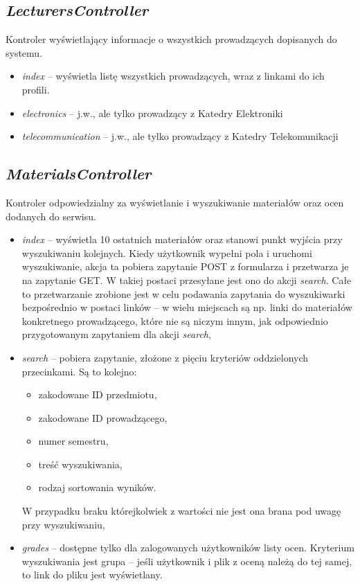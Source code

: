 \documentclass[a4paper,12pt,oneside]{report}
\begin{document}
\subsection{\emph{LecturersController}}
\label{con:lecturers}
  Kontroler wyświetlający informacje o wszystkich prowadzących dopisanych do systemu.
\begin{itemize}
  \item \emph{index} -- wyświetla listę wszystkich prowadzących, wraz z linkami do ich profili.
  \item \emph{electronics} -- j.w., ale tylko prowadzący z Katedry Elektroniki
  \item \emph{telecommunication} -- j.w., ale tylko prowadzący z Katedry Telekomunikacji
\end{itemize}

\subsection{\emph{MaterialsController}}
\label{con:materials}
  Kontroler odpowiedzialny za wyświetlanie i wyszukiwanie materiałów oraz ocen dodanych do serwisu.
\begin{itemize}
  \item \emph{index} -- wyświetla 10 ostatnich materiałów oraz stanowi punkt wyjścia przy wyszukiwaniu kolejnych. Kiedy użytkownik wypełni pola i uruchomi wyszukiwanie, akcja ta pobiera zapytanie POST z formularza i przetwarza je na zapytanie GET. W takiej postaci przesyłane jest ono do akcji \emph{search}. Całe to przetwarzanie zrobione jest w celu podawania zapytania do wyszukiwarki bezpośrednio w postaci linków -- w wielu miejscach są np. linki do materiałów konkretnego prowadzącego, które nie są niczym innym, jak odpowiednio przygotowanym zapytaniem dla akcji \emph{search},
  \item \emph{search} -- pobiera zapytanie, złożone z pięciu kryteriów oddzielonych przecinkami. Są to kolejno:
  \begin{itemize}
    \item zakodowane ID przedmiotu,
    \item zakodowane ID prowadzącego,
    \item numer semestru,
    \item treść wyszukiwania,
    \item rodzaj sortowania wyników.
  \end{itemize}
  W przypadku braku którejkolwiek z wartości nie jest ona brana pod uwagę przy wyszukiwaniu,
  \item \emph{grades} -- dostępne tylko dla zalogowanych użytkowników listy ocen. Kryterium wyszukiwania jest grupa -- jeśli użytkownik i plik z oceną należą do tej samej, to link do pliku jest wyświetlany.
\end{itemize}
\end{document}
